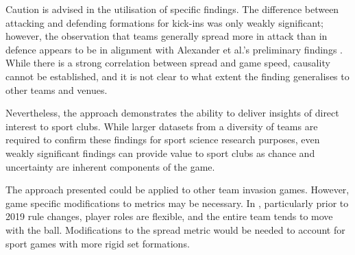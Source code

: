 Caution is advised in the utilisation of specific findings. The difference between attacking and defending formations for kick-ins was only weakly significant; however, the observation that teams generally spread more in attack than in defence appears to be in alignment with Alexander et al.'s preliminary findings \cite{Alexander2019a, Alexander2019b}. While there is a strong correlation between spread and game speed, causality cannot be established, and it is not clear to what extent the finding generalises to other teams and venues.

Nevertheless, the approach demonstrates the ability to deliver insights of direct interest to sport clubs. While larger datasets from a diversity of teams are required %
to confirm these findings for sport science research purposes,
even weakly significant findings can provide value to sport clubs as chance and uncertainty are inherent components of the game.

The approach presented could be applied to other team invasion games. However, game specific modifications to metrics may be necessary. In \afl{}, particularly prior to 2019 rule changes, player roles are flexible, and the entire team tends to move with the ball. Modifications to the spread metric would be needed to account for sport games with more rigid set formations.



